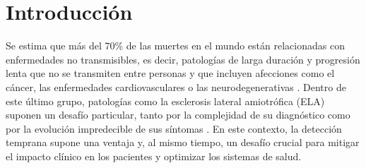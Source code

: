 \section{Introducción}
Se estima que más del 70\% de las muertes en el mundo están relacionadas con enfermedades no transmisibles, es decir, patologías de larga duración y progresión lenta que no se transmiten entre personas y que incluyen afecciones como el cáncer, las enfermedades cardiovasculares o las neurodegenerativas \cite{who2023}. Dentro de este último grupo, patologías como la esclerosis lateral amiotrófica (ELA) suponen un desafío particular, tanto por la complejidad de su diagnóstico como por la evolución impredecible de sus síntomas \cite{Hardiman2017}. En este contexto, la detección temprana supone una ventaja y, al mismo tiempo, un desafío crucial para mitigar el impacto clínico en los pacientes y optimizar los sistemas de salud. 
